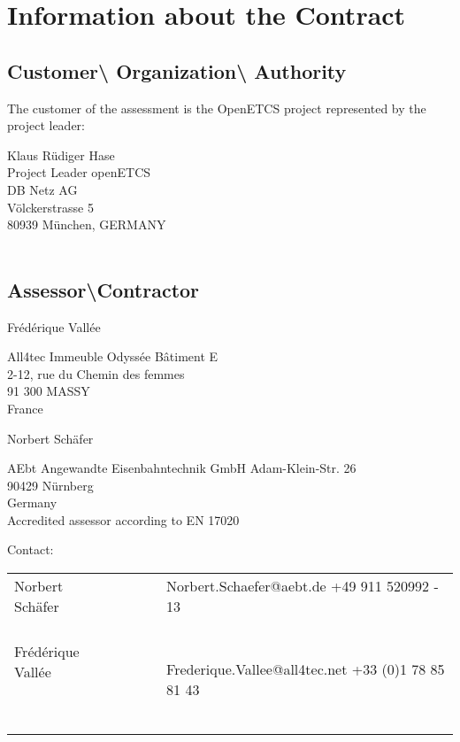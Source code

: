 \clearpage\section{Information about the Contract}
\subsection{Customer{\textbackslash}
Organization{\textbackslash} Authority}
The customer of the assessment is the OpenETCS project represented by the project leader:

Klaus R\"udiger Hase\\
Project Leader openETCS \\
DB Netz AG\\
Völckerstrasse 5\\
80939 München, GERMANY\\
\\


\bigskip

\subsection{Assessor{\textbackslash}Contractor}
Fr\'ed\'erique Vall\'ee

All4tec\newline
  Immeuble Odyss\'ee B\^{a}timent E \\
  2-12, rue du Chemin des femmes\\
  91 300 MASSY\\
  France\\


\bigskip

Norbert Sch\"afer

AEbt Angewandte Eisenbahntechnik GmbH\newline
  Adam-Klein-Str. 26\\
  90429 N\"urnberg\\
  Germany\\

Accredited assessor according to EN 17020


\bigskip


\bigskip

Contact:

\begin{flushleft}
\tablefirsthead{}
\tablehead{}
\tabletail{}
\tablelasttail{}
\begin{supertabular}{m{4.0020003cm}m{2.3539999cm}m{2.3539999cm}m{7.491cm}}
Norbert Sch\"afer &
~
 &
~
 &
Norbert.Schaefer@aebt.de\newline
+49 911 520992 - 13\\
\\
Fr\'ed\'erique Vall\'ee

~
 &
~
 &
~
 &
Frederique.Vallee@all4tec.net\newline
+33 (0)1 78 85 81 43\\
\end{supertabular}
\end{flushleft}

